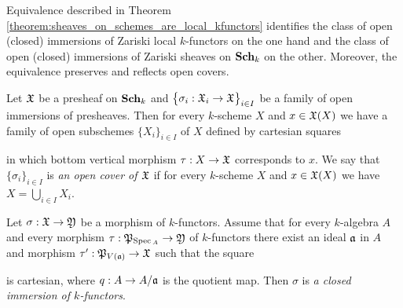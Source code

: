 \begin{remark}\label{remark:open_and_closed_immersions_for_Zariski_local_and_Zariski_sheaves_are_the_same}
Equivalence described in Theorem \ref{theorem:sheaves_on_schemes_are_local_kfunctors} identifies the class of open (closed) immersions of Zariski local $k$-functors on the one hand and the class of open (closed) immersions of Zariski sheaves on $\mathbf{Sch}_k$ on the other. Moreover, the equivalence preserves and reflects open covers.
\end{remark}


\begin{definition}
Let ${\mathfrak X}$ be a presheaf on $\mathbf{Sch}_k$ and $\big\{\sigma_i:{\mathfrak X}_i\rightarrow {\mathfrak X}\big\}_{i\in I}$ be a family of open immersions of presheaves. Then for every $k$-scheme $X$ and $x\in {\mathfrak X}(X)$ we have a family of open subschemes $\{X_i\}_{i\in I}$ of $X$ defined by cartesian squares
\begin{center}
\end{center}
in which bottom vertical morphism $\tau:X \rightarrow {\mathfrak X}$ corresponds to $x$. We say that $\{\sigma_i\}_{i\in I}$ is \textit{an open cover of ${\mathfrak X}$} if for every $k$-scheme $X$ and $x\in {\mathfrak X}(X)$ we have $X = \bigcup_{i\in I}X_i$.
\end{definition}




\begin{definition}
Let $\sigma:{\mathfrak X}\rightarrow {\mathfrak Y}$ be a morphism of $k$-functors. Assume that for every $k$-algebra $A$ and every morphism $\tau:{\mathfrak P}_{\mathrm{Spec}\,_A}\rightarrow {\mathfrak Y}$ of $k$-functors there exist an ideal $\mathfrak{a}$ in $A$ and morphism $\tau':{\mathfrak P}_{V(\mathfrak{a})}\rightarrow {\mathfrak X}$ such that the square
\begin{center}
\end{center}
is cartesian, where $q:A\rightarrow A/\mathfrak{a}$ is the quotient map. Then $\sigma$ is \textit{a closed immersion of $k$-functors}.
\end{definition}

